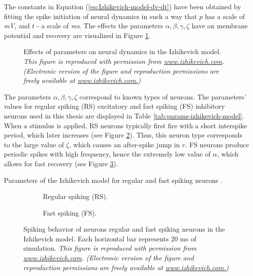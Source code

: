 The constants in Equation (\ref{eq:Izhikevich-model-dv-dt}) have been obtained by fitting the spike initiation of neural dynamics in such a way that $p$ has a scale of \textit{mV}, and $t$ - a scale of \textit{ms}.
The effects the parameters $\alpha, \beta, \gamma, \zeta$ have on membrane potential and recovery are visualized in Figure \ref{fig:neural-dynamics}.

\begin{figure}
    \centering
    
    \caption{Effects of parameters on neural dynamics in the Izhikevich model. {\it This figure is reproduced with permission from \url{www.izhikevich.com}. (Electronic version of the figure and reproduction permissions are freely available at \url{www.izhikevich.com.})}}
    \label{fig:neural-dynamics}
\end{figure}

The parameters $\alpha, \beta, \gamma, \zeta$ correspond to known types of neurons. The parameters' values for regular spiking (RS) excitatory and fast spiking (FS) inhibitory neurons used in this thesis are displayed in Table \ref{tab:params-izhikevich-model}. When a stimulus is applied, RS neurons typically first fire with a short interspike period, which later increases (see Figure \ref{fig:neuron-types-rs}). Thus, this neuron type corresponds to the large value of $\zeta$, which causes an after-spike jump in $r$. FS neurons produce periodic spikes with high frequency, hence the extremely low value of $\alpha$, which allows for fast recovery (see Figure \ref{fig:neuron-types-fs}).

\begin{table}[!htp] 
    \centering
    
    \caption{Parameters of the Izhikevich model for regular and fast spiking neurons \cite{Izhikevich2003}.}
\label{tab:params-izhikevich-model}
\end{table}

\begin{figure}[!htp]
\hspace*{-1.5cm} 
    \centering
    \begin{subfigure}[t]{0.3\textwidth}
        \centering
        
        \caption{{Regular spiking (RS).}}
        \label{fig:neuron-types-rs}
    \end{subfigure}
    \hspace{0.1\textwidth}
    \begin{subfigure}[t]{0.3\textwidth}
        \centering
        
        \caption{Fast spiking (FS).}
        \label{fig:neuron-types-fs}
    \end{subfigure}
    \caption{Spiking behavior of neurons regular and fast spiking neurons in the Izhikevich model. Each horizontal bar represents 20 ms of simulation. {\it This figure is reproduced with permission from \url{www.izhikevich.com}. (Electronic version of the figure and reproduction permissions are freely available at \url{www.izhikevich.com.})}}
    \label{fig:neuron-types}
\end{figure}


